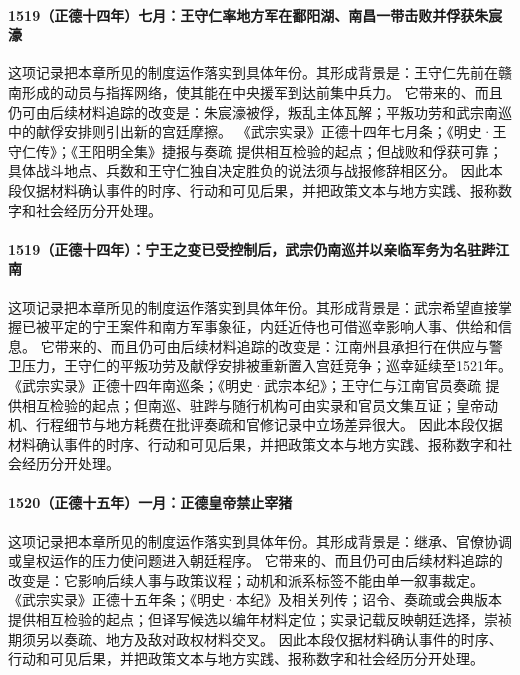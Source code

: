 \paragraph{1519（正德十四年）七月：王守仁率地方军在鄱阳湖、南昌一带击败并俘获朱宸濠} 这项记录把本章所见的制度运作落实到具体年份。其形成背景是：王守仁先前在赣南形成的动员与指挥网络，使其能在中央援军到达前集中兵力。 它带来的、而且仍可由后续材料追踪的改变是：朱宸濠被俘，叛乱主体瓦解；平叛功劳和武宗南巡中的献俘安排则引出新的宫廷摩擦。 《武宗实录》正德十四年七月条；《明史·王守仁传》；《王阳明全集》捷报与奏疏 提供相互检验的起点；但战败和俘获可靠；具体战斗地点、兵数和王守仁独自决定胜负的说法须与战报修辞相区分。 因此本段仅据材料确认事件的时序、行动和可见后果，并把政策文本与地方实践、报称数字和社会经历分开处理。

\paragraph{1519（正德十四年）：宁王之变已受控制后，武宗仍南巡并以亲临军务为名驻跸江南} 这项记录把本章所见的制度运作落实到具体年份。其形成背景是：武宗希望直接掌握已被平定的宁王案件和南方军事象征，内廷近侍也可借巡幸影响人事、供给和信息。 它带来的、而且仍可由后续材料追踪的改变是：江南州县承担行在供应与警卫压力，王守仁的平叛功劳及献俘安排被重新置入宫廷竞争；巡幸延续至1521年。 《武宗实录》正德十四年南巡条；《明史·武宗本纪》；王守仁与江南官员奏疏 提供相互检验的起点；但南巡、驻跸与随行机构可由实录和官员文集互证；皇帝动机、行程细节与地方耗费在批评奏疏和官修记录中立场差异很大。 因此本段仅据材料确认事件的时序、行动和可见后果，并把政策文本与地方实践、报称数字和社会经历分开处理。

\paragraph{1520（正德十五年）一月：正德皇帝禁止宰猪} 这项记录把本章所见的制度运作落实到具体年份。其形成背景是：继承、官僚协调或皇权运作的压力使问题进入朝廷程序。 它带来的、而且仍可由后续材料追踪的改变是：它影响后续人事与政策议程；动机和派系标签不能由单一叙事裁定。 《武宗实录》正德十五年条；《明史·本纪》及相关列传；诏令、奏疏或会典版本 提供相互检验的起点；但译写候选以编年材料定位；实录记载反映朝廷选择，崇祯期须另以奏疏、地方及敌对政权材料交叉。 因此本段仅据材料确认事件的时序、行动和可见后果，并把政策文本与地方实践、报称数字和社会经历分开处理。

